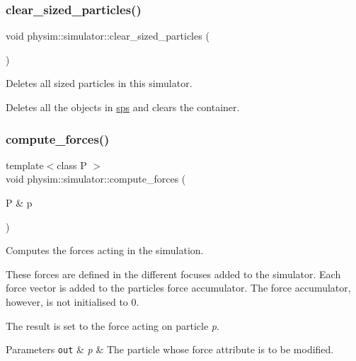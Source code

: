 \subsubsection{\texorpdfstring{clear\+\_\+sized\+\_\+particles()}{clear\_sized\_particles()}}
{\footnotesize\ttfamily void physim\+::simulator\+::clear\+\_\+sized\+\_\+particles (\begin{DoxyParamCaption}{ }\end{DoxyParamCaption})}



Deletes all sized particles in this simulator. 

Deletes all the objects in \hyperlink{classphysim_1_1simulator_ad3bc00314e9fd8435125ff1225c0658b}{sps} and clears the container. \mbox{\label{classphysim_1_1simulator_a00c7815358139bf08b2e13fe1ab377bc}} 
\subsubsection{\texorpdfstring{compute\+\_\+forces()}{compute\_forces()}}
{\footnotesize\ttfamily template$<$class P $>$ \\
void physim\+::simulator\+::compute\+\_\+forces (\begin{DoxyParamCaption}\item[{P \&}]{p }\end{DoxyParamCaption})\hspace{0.3cm}{\ttfamily [private]}}



Computes the forces acting in the simulation. 

These forces are defined in the different focuses added to the simulator. Each force vector is added to the particle\textquotesingle{}s force accumulator. The force accumulator, however, is not initialised to 0.

The result is set to the force acting on particle {\itshape p}. 
\begin{DoxyParams}[1]{Parameters}
\mbox{\tt out}  & {\em p} & The particle whose force attribute is to be modified. \\
\hline
\end{DoxyParams}
\mbox{\label{classphysim_1_1simulator_a223170686fbf961c62d52da3fdc964c8}} 
